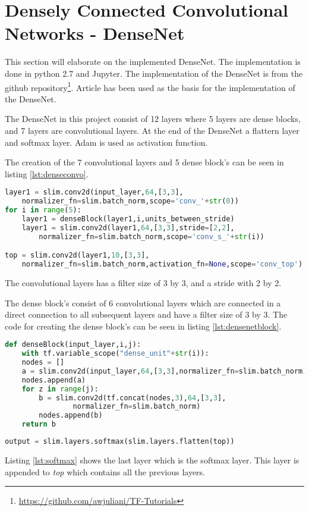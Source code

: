 \section{Densely Connected Convolutional Networks - DenseNet}

This section will elaborate on the implemented DenseNet. The implementation is done in python 2.7 and Jupyter. The implementation of the DenseNet is from the github repository\footnote{\url{https://github.com/awjuliani/TF-Tutorials}}. Article \citep{DENSE} has been used as the basis for the implementation of the DenseNet.

The DenseNet in this project consist of 12 layers where 5 layers are dense blocks, and 7 layers are convolutional layers. At the end of the DenseNet a flattern layer and softmax layer. Adam is used as activation function.

The creation of the 7 convolutional layers and 5 dense block's can be seen in listing \ref{lst:denseconvo}.

\begin{lstlisting}[language=Python, label=lst:denseconvo, caption=for loop which creates the dense block's mixed with the convolutional layers]
layer1 = slim.conv2d(input_layer,64,[3,3],
	normalizer_fn=slim.batch_norm,scope='conv_'+str(0))
for i in range(5):
	layer1 = denseBlock(layer1,i,units_between_stride)
	layer1 = slim.conv2d(layer1,64,[3,3],stride=[2,2],
		normalizer_fn=slim.batch_norm,scope='conv_s_'+str(i))

top = slim.conv2d(layer1,10,[3,3],
	normalizer_fn=slim.batch_norm,activation_fn=None,scope='conv_top')
\end{lstlisting}

The convolutional layers has a filter size of 3 by 3, and a stride with 2 by 2. 

The dense block's consist of 6 convolutional layers which are connected in a direct connection to all subsequent layers and have a filter size of 3 by 3. The code for creating the dense block's can be seen in listing \ref{lst:densenetblock}.

\begin{lstlisting}[language=Python, label=lst:densenetblock, caption=DenseNet Block function]
def denseBlock(input_layer,i,j):
	with tf.variable_scope("dense_unit"+str(i)):
	nodes = []
	a = slim.conv2d(input_layer,64,[3,3],normalizer_fn=slim.batch_norm)
	nodes.append(a)
	for z in range(j):
		b = slim.conv2d(tf.concat(nodes,3),64,[3,3],
				normalizer_fn=slim.batch_norm)
		nodes.append(b)
	return b
\end{lstlisting}

\begin{lstlisting}[language=Python, label=lst:softmax, caption=Softmax layer appended to the end of the DenseNet]
output = slim.layers.softmax(slim.layers.flatten(top))
\end{lstlisting}

Listing \ref{lst:softmax} shows the last layer which is the softmax layer. This layer is appended to \emph{top} which contains all the previous layers.